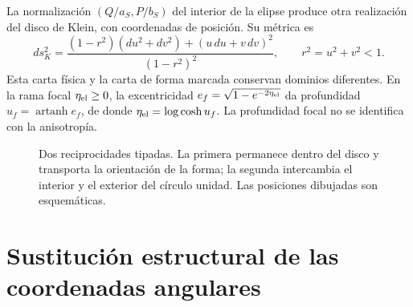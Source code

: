 La normalización \((Q/a_S,P/b_S)\) del interior de la elipse produce otra realización del disco de Klein, con coordenadas de posición. Su métrica es
\[
 ds_K^2=\frac{(1-r^2)(du^2+dv^2)+(u\,du+v\,dv)^2}{(1-r^2)^2},
 \qquad r^2=u^2+v^2<1.
\]
Esta carta física y la carta de forma marcada conservan dominios diferentes. En la rama focal \(\eta_{\rm el}\ge0\), la excentricidad \(e_f=\sqrt{1-e^{-2\eta_{\rm el}}}\) da profundidad \(u_f=\operatorname{artanh}e_f\), de donde \(\eta_{\rm el}=\log\cosh u_f\). La profundidad focal no se identifica con la anisotropía.

\begin{figure}[htbp]
\centering
{}
\caption{Dos reciprocidades tipadas. La primera permanece dentro del disco y transporta la orientación de la forma; la segunda intercambia el interior y el exterior del círculo unidad. Las posiciones dibujadas son esquemáticas.}
\label{x_reciprocidad:fig:rec-dos-cartas}
\end{figure}

\section{Sustitución estructural de las coordenadas angulares}
\label{x_reciprocidad:rec:sustitucion}

